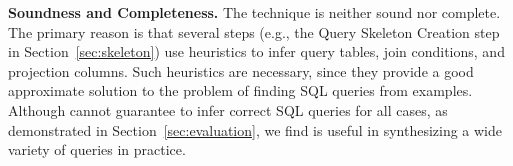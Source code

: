 \vspace{-1mm}


\noindent \textbf{Soundness and Completeness.} The \ourtool
technique is neither sound nor complete. The primary
reason is that several steps (e.g., the Query Skeleton Creation
step in Section~\ref{sec:skeleton}) use heuristics
to infer query tables, join conditions, and projection columns.
Such heuristics are necessary, since they provide a
good approximate solution to the problem of finding SQL queries
from examples. %
Although \ourtool cannot guarantee to infer correct SQL queries
for all cases, as demonstrated in Section~\ref{sec:evaluation},
we find \ourtool
is useful in synthesizing a wide variety of queries in practice.

